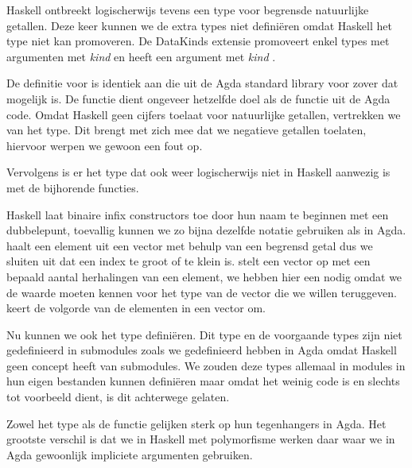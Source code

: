Haskell ontbreekt logischerwijs tevens een type voor begrensde natuurlijke
getallen. Deze keer kunnen we de extra types niet definiëren omdat Haskell het
 type niet kan promoveren. De DataKinds extensie promoveert enkel
types met argumenten met \emph{kind} \ihask{*} en  heeft een argument met
\emph{kind} .


De definitie voor  is identiek aan die uit de Agda standard library
voor zover dat mogelijk is. De functie  dient ongeveer
hetzelfde doel als de  functie uit de Agda code. Omdat Haskell
geen cijfers toelaat voor natuurlijke getallen, vertrekken we van het
 type. Dit brengt met zich mee dat we negatieve getallen
toelaten, hiervoor werpen we gewoon een fout op.

Vervolgens is er het type  dat ook weer logischerwijs niet in
Haskell aanwezig is met de bijhorende functies.


Haskell laat binaire infix constructors toe door hun naam te beginnen met een
dubbelepunt, toevallig kunnen we zo bijna dezelfde notatie gebruiken als in
Agda.  haalt een element uit een vector met behulp van een
begrensd getal dus we sluiten uit dat een index te groot of te klein is.
 stelt een vector op met een bepaald aantal herhalingen van
een element, we hebben hier een  nodig omdat we de waarde
 moeten kennen voor het type van de vector die we willen teruggeven.
 keert de volgorde van de elementen in een vector om.

Nu kunnen we ook het  type definiëren. Dit type en de voorgaande
types zijn niet gedefinieerd in submodules zoals we  gedefinieerd
hebben in Agda omdat Haskell geen concept heeft van submodules. We zouden deze
types allemaal in modules in hun eigen bestanden kunnen definiëren maar omdat
het weinig code is en slechts tot voorbeeld dient, is dit achterwege gelaten.


Zowel het  type als de  functie gelijken sterk op
hun tegenhangers in Agda. Het grootste verschil is dat we in Haskell met
polymorfisme werken daar waar we in Agda gewoonlijk impliciete argumenten
gebruiken.

